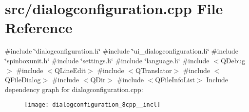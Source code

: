 \section{src/dialogconfiguration.cpp File Reference}
\label{dialogconfiguration_8cpp}
{\ttfamily \#include \char`\"{}dialogconfiguration.\+h\char`\"{}}\newline
{\ttfamily \#include \char`\"{}ui\+\_\+dialogconfiguration.\+h\char`\"{}}\newline
{\ttfamily \#include \char`\"{}spinboxunit.\+h\char`\"{}}\newline
{\ttfamily \#include \char`\"{}settings.\+h\char`\"{}}\newline
{\ttfamily \#include \char`\"{}language.\+h\char`\"{}}\newline
{\ttfamily \#include $<$Q\+Debug$>$}\newline
{\ttfamily \#include $<$Q\+Line\+Edit$>$}\newline
{\ttfamily \#include $<$Q\+Translator$>$}\newline
{\ttfamily \#include $<$Q\+File\+Dialog$>$}\newline
{\ttfamily \#include $<$Q\+Dir$>$}\newline
{\ttfamily \#include $<$Q\+File\+Info\+List$>$}\newline
Include dependency graph for dialogconfiguration.\+cpp\+:\nopagebreak
\begin{figure}[H]
\begin{center}
\leavevmode
\texttt{[image: dialogconfiguration\_8cpp\_\_incl]}
\end{center}
\end{figure}

